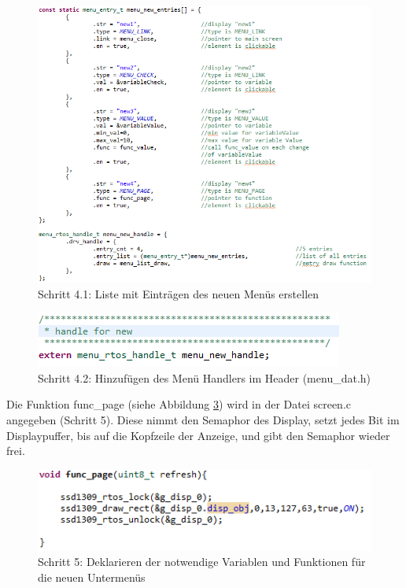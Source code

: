\begin{figure}[H] %
\includegraphics[width=.75\textwidth]{sec6/images/AddMenu3} 
\centering
\captionsetup{width=.95\textwidth}
\caption[Schritt 4.1: Liste mit Einträgen des neuen Menüs erstellen]{Schritt 4.1: Liste mit Einträgen des neuen Menüs erstellen}\centering
\label{fig:AddMenu3}
\end{figure}
\begin{figure}[H] %
\includegraphics[width=.75\textwidth]{sec6/images/AddMenuPrototyp} 
\centering
\captionsetup{width=.95\textwidth}
\caption[Schritt 4.2: Hinzufügen des Menü Handlers im Header]{Schritt 4.2: Hinzufügen des Menü Handlers im Header (\glqq menu\_dat.h\grqq{})}\centering
\label{fig:AddMenuPrototyp}
\end{figure}


Die Funktion \glqq func\_page\grqq{} (siehe Abbildung \ref{fig:PageFunction}) wird in der Datei \glqq screen.c\grqq{} angegeben (Schritt 5). Diese nimmt den Semaphor des Display, setzt jedes Bit im Displaypuffer, bis auf die Kopfzeile der Anzeige, und gibt den Semaphor wieder frei.

\begin{figure}[H] %
\includegraphics[width=.75\textwidth]{sec6/images/PageFunction} 
\centering
\captionsetup{width=.95\textwidth}
\caption[Schritt 5: Deklarieren der notwendige Variablen und Funktionen für die neuen Untermenüs]{Schritt 5: Deklarieren der notwendige Variablen und Funktionen für die neuen Untermenüs}\centering
\label{fig:PageFunction}
\end{figure}

